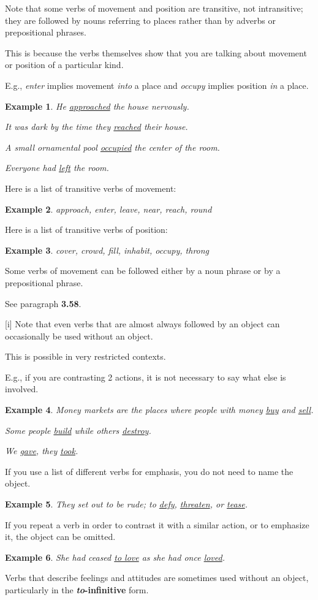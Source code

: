 \documentclass[oneside]{book}
\numberwithin{equation}{section}
\newtheorem{example}{Example}[section]
\begin{document}
%
\noindent{} Note that some verbs of movement and position are transitive, not intransitive; they are followed by nouns referring to places rather than by adverbs or prepositional phrases.

This is because the verbs themselves show that you are talking about movement or position of a particular kind.

E.g., \textit{enter} implies movement \textit{into} a place and \textit{occupy} implies position \textit{in} a place.
\begin{example}
    He \underline{approached} the house nervously.
    
    It was dark by the time they \underline{reached} their house.
    
    A small ornamental pool \underline{occupied} the center of the room.
    
    Everyone had \underline{left} the room.
\end{example}
Here is a list of transitive verbs of movement:
\begin{example}
    approach, enter, leave, near, reach, round
\end{example}
Here is a list of transitive verbs of position:
\begin{example}
    cover, crowd, fill, inhabit, occupy, throng
\end{example}
Some verbs of movement can be followed either by a noun phrase or by a prepositional phrase.

See paragraph \textbf{3.58}.

%
\noindent{} [i] Note that even verbs that are almost always followed by an object can occasionally be used without an object.

This is possible in very restricted contexts.

E.g., if you are contrasting 2 actions, it is not necessary to say what else is involved.
\begin{example}
    Money markets are the places where people with money \underline{buy} and \underline{sell}.
    
    Some people \underline{build} while others \underline{destroy}.
    
    We \underline{gave}, they \underline{took}.
\end{example}
If you use a list of different verbs for emphasis, you do not need to name the object.
\begin{example}
    They set out to be rude; to \underline{defy}, \underline{threaten}, or \underline{tease}.
\end{example}
If you repeat a verb in order to contrast it with a similar action, or to emphasize it, the object can be omitted.
\begin{example}
    She had ceased \underline{to love} as she had once \underline{loved}.
\end{example}
%
\noindent{} Verbs that describe feelings and attitudes are sometimes used without an object, particularly in the \textbf{\textit{to}-infinitive} form.
\end{document}
